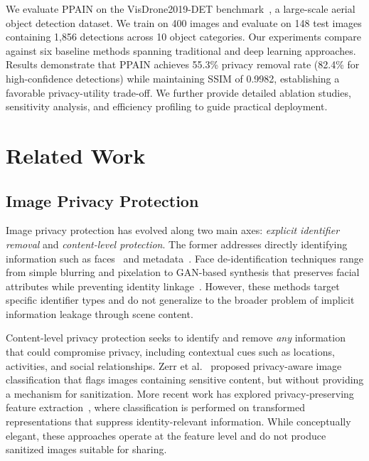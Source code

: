 \documentclass[preprint,12pt]{elsarticle}
\begin{document}
We evaluate PPAIN on the VisDrone2019-DET benchmark~\cite{visdrone2019}, a large-scale aerial object detection dataset. We train on 400 images and evaluate on 148 test images containing 1,856 detections across 10 object categories. Our experiments compare against six baseline methods spanning traditional and deep learning approaches. Results demonstrate that PPAIN achieves 55.3\% privacy removal rate (82.4\% for high-confidence detections) while maintaining SSIM of 0.9982, establishing a favorable privacy-utility trade-off. We further provide detailed ablation studies, sensitivity analysis, and efficiency profiling to guide practical deployment.


\section{Related Work}
\label{sec:related}

\subsection{Image Privacy Protection}

Image privacy protection has evolved along two main axes: \emph{explicit identifier removal} and \emph{content-level protection}. The former addresses directly identifying information such as faces~\cite{du2014face,li2019face,oh2016face} and metadata~\cite{zerr2012privacy}. Face de-identification techniques range from simple blurring and pixelation to GAN-based synthesis that preserves facial attributes while preventing identity linkage~\cite{ryoo2017privacy}. However, these methods target specific identifier types and do not generalize to the broader problem of implicit information leakage through scene content.

Content-level privacy protection seeks to identify and remove \emph{any} information that could compromise privacy, including contextual cues such as locations, activities, and social relationships. Zerr et al.~\cite{zerr2012privacy} proposed privacy-aware image classification that flags images containing sensitive content, but without providing a mechanism for sanitization. More recent work has explored privacy-preserving feature extraction~\cite{ryoo2017privacy}, where classification is performed on transformed representations that suppress identity-relevant information. While conceptually elegant, these approaches operate at the feature level and do not produce sanitized images suitable for sharing.
\end{document}
